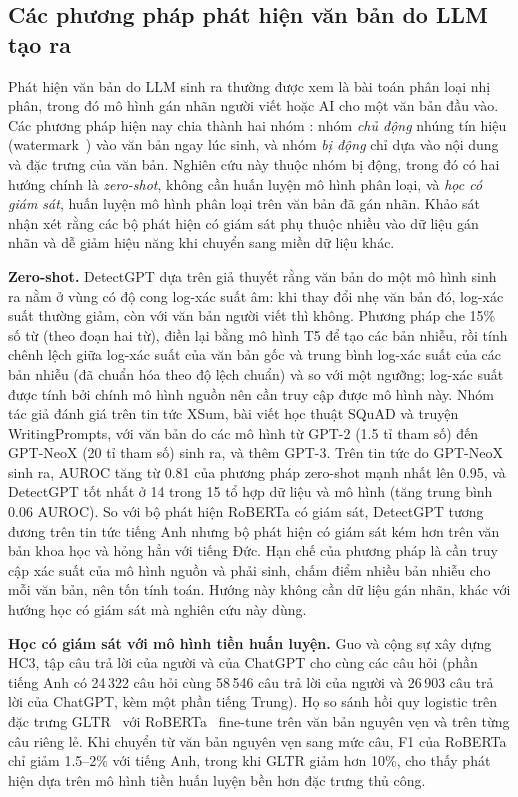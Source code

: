 \documentclass[conference,a4paper]{IEEEtran}
\begin{document}
\subsection{Các phương pháp phát hiện văn bản do LLM tạo ra}
Phát hiện văn bản do LLM sinh ra thường được xem là bài toán phân loại nhị phân, trong đó mô hình gán nhãn người viết hoặc AI cho một văn bản đầu vào. Các phương pháp hiện nay chia thành hai nhóm \cite{wu2025survey}: nhóm \emph{chủ động} nhúng tín hiệu (watermark~\cite{kirchenbauer2023watermark}) vào văn bản ngay lúc sinh, và nhóm \emph{bị động} chỉ dựa vào nội dung và đặc trưng của văn bản. Nghiên cứu này thuộc nhóm bị động, trong đó có hai hướng chính là \emph{zero-shot}, không cần huấn luyện mô hình phân loại, và \emph{học có giám sát}, huấn luyện mô hình phân loại trên văn bản đã gán nhãn. Khảo sát \cite{xiang_survey} nhận xét rằng các bộ phát hiện có giám sát phụ thuộc nhiều vào dữ liệu gán nhãn và dễ giảm hiệu năng khi chuyển sang miền dữ liệu khác.

\textbf{Zero-shot.} DetectGPT \cite{mitchell2023detectgpt} dựa trên giả thuyết rằng văn bản do một mô hình sinh ra nằm ở vùng có độ cong log-xác suất âm: khi thay đổi nhẹ văn bản đó, log-xác suất thường giảm, còn với văn bản người viết thì không. Phương pháp che 15\% số từ (theo đoạn hai từ), điền lại bằng mô hình T5 để tạo các bản nhiễu, rồi tính chênh lệch giữa log-xác suất của văn bản gốc và trung bình log-xác suất của các bản nhiễu (đã chuẩn hóa theo độ lệch chuẩn) và so với một ngưỡng; log-xác suất được tính bởi chính mô hình nguồn nên cần truy cập được mô hình này. Nhóm tác giả đánh giá trên tin tức XSum, bài viết học thuật SQuAD và truyện WritingPrompts, với văn bản do các mô hình từ GPT-2 (1.5 tỉ tham số) đến GPT-NeoX (20 tỉ tham số) sinh ra, và thêm GPT-3. Trên tin tức do GPT-NeoX sinh ra, AUROC tăng từ 0.81 của phương pháp zero-shot mạnh nhất lên 0.95, và DetectGPT tốt nhất ở 14 trong 15 tổ hợp dữ liệu và mô hình (tăng trung bình 0.06 AUROC). So với bộ phát hiện RoBERTa có giám sát, DetectGPT tương đương trên tin tức tiếng Anh nhưng bộ phát hiện có giám sát kém hơn trên văn bản khoa học và hỏng hẳn với tiếng Đức. Hạn chế của phương pháp là cần truy cập xác suất của mô hình nguồn và phải sinh, chấm điểm nhiều bản nhiễu cho mỗi văn bản, nên tốn tính toán. Hướng này không cần dữ liệu gán nhãn, khác với hướng học có giám sát mà nghiên cứu này dùng.

\textbf{Học có giám sát với mô hình tiền huấn luyện.} Guo và cộng sự \cite{guo2023hc3} xây dựng HC3, tập câu trả lời của người và của ChatGPT cho cùng các câu hỏi (phần tiếng Anh có 24\,322 câu hỏi cùng 58\,546 câu trả lời của người và 26\,903 câu trả lời của ChatGPT, kèm một phần tiếng Trung). Họ so sánh hồi quy logistic trên đặc trưng GLTR~\cite{gehrmann2019gltr} với RoBERTa~\cite{liu2019roberta} fine-tune trên văn bản nguyên vẹn và trên từng câu riêng lẻ. Khi chuyển từ văn bản nguyên vẹn sang mức câu, F1 của RoBERTa chỉ giảm 1.5--2\% với tiếng Anh, trong khi GLTR giảm hơn 10\%, cho thấy phát hiện dựa trên mô hình tiền huấn luyện bền hơn đặc trưng thủ công.
\end{document}

